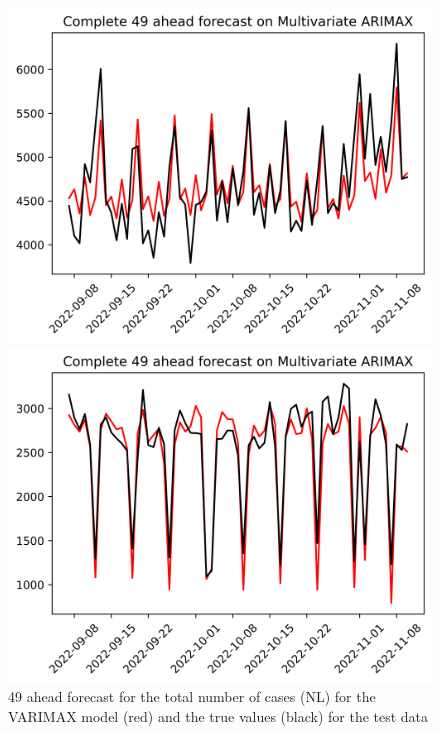 \begin{figure}

\begin{minipage}{.32\textwidth}
  \centering
  \includegraphics[width=\linewidth]{pics/49_ah/Complete_49_ahead_Multivariate ARIMAX.png}
  \caption{49 ahead forecast for the total number of cases (NL) for the VARIMAX model (red) and the true values (black) for the test data}
  \label{fig:tot_cases_fc_49_VARIMAX}
\end{minipage}
\begin{minipage}{.32\textwidth}
  \centering
  \includegraphics[width=\linewidth]{pics/49_ah/DE_Complete_49_ahead_Multivariate ARIMAX.png}

\end{minipage}
\end{figure}
